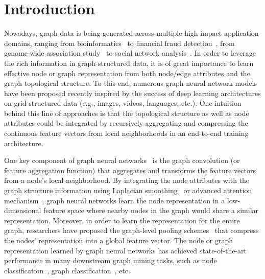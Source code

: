 \documentclass[sigconf]{acmart}
\begin{document}



\maketitle

\section{Introduction}
Nowadays, graph data is being generated across multiple high-impact application domains, ranging from bioinformatics~\cite{gilmer2017neural} to financial fraud detection~\cite{zhou2018sparc, zhou2017local}, from genome-wide association study~\cite{wu2018leveraging} to social network analysis~\cite{hamilton2017inductive}. In order to leverage the rich information in graph-structured data, it is of great importance to learn effective node or graph representation from both node/edge attributes and the graph topological structure. To this end, numerous graph neural network models have been proposed recently inspired by the success of deep learning architectures on grid-structured data (e.g., images, videos, languages, etc.). One intuition behind this line of approaches is that the topological structure as well as node attributes could be integrated by recursively aggregating and compressing the continuous feature vectors from local neighborhoods in an end-to-end training architecture.

One key component of graph neural networks~\cite{hamilton2017representation, gilmer2017neural} is the graph convolution (or feature aggregation function) that aggregates and transforms the feature vectors from a node's local neighborhood. By integrating the node attributes with the graph structure information using Laplacian smoothing~\cite{li2018deeper, kipf2016semi} or advanced attention mechanism~\cite{velickovic2017graph}, graph neural networks learn the node representation in a low-dimensional feature space where nearby nodes in the graph would share a similar representation. Moreover, in order to learn the representation for the entire graph, researchers have proposed the graph-level pooling schemes~\cite{atwood2016diffusion} that compress the nodes' representation into a global feature vector. The node or graph representation learned by graph neural networks has achieved state-of-the-art performance in many downstream graph mining tasks, such as node classification~\cite{zhang2018graph}, graph classification~\cite{xu2018powerful}, etc.
\end{document}
